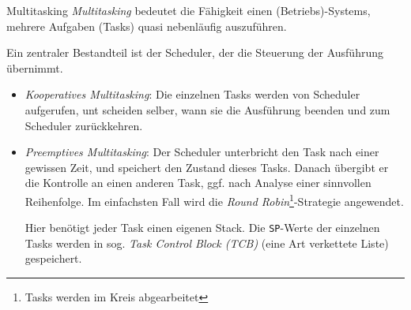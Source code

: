\begin{defi}{Multitasking}
    \emph{Multitasking} bedeutet die Fähigkeit einen (Betriebs)-Systems, mehrere Aufgaben (Tasks) quasi nebenläufig auszuführen.

    Ein zentraler Bestandteil ist der Scheduler, der die Steuerung der Ausführung übernimmt.

    \begin{itemize}
        \item \emph{Kooperatives Multitasking}: Die einzelnen Tasks werden von Scheduler aufgerufen, unt scheiden selber, wann sie die Ausführung beenden und zum Scheduler zurückkehren.
        \item \emph{Preemptives Multitasking}: Der Scheduler unterbricht den Task nach einer gewissen Zeit, und speichert den Zustand dieses Tasks.
              Danach übergibt er die Kontrolle an einen anderen Task, ggf. nach Analyse einer sinnvollen Reihenfolge.
              Im einfachsten Fall wird die \emph{Round Robin}\footnote{Tasks werden im Kreis abgearbeitet}-Strategie angewendet.

              Hier benötigt jeder Task einen eigenen Stack.
              Die \texttt{SP}-Werte der einzelnen Tasks werden in sog. \emph{Task Control Block (TCB)} (eine Art verkettete Liste) gespeichert.
    \end{itemize}
\end{defi}